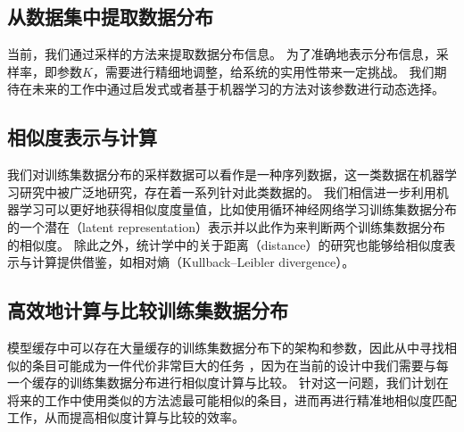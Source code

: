 \subsection{从数据集中提取数据分布}
当前，我们通过采样的方法来提取数据分布信息。
为了准确地表示分布信息，采样率，即参数$K$，需要进行精细地调整，给系统的实用性带来一定挑战。
我们期待在未来的工作中通过启发式或者基于机器学习的方法对该参数进行动态选择。


\subsection{相似度表示与计算}
我们对训练集数据分布的采样数据可以看作是一种序列数据，这一类数据在机器学习研究中被广泛地研究，存在着一系列针对此类数据的{\model}\cite{krizhevsky2012imagenet, szegedy2015going, simonyan2014very}。
我们相信进一步利用机器学习可以更好地获得相似度度量值，比如使用循环神经网络学习训练集数据分布的一个潜在（latent representation）表示并以此作为{\model}来判断两个训练集数据分布的相似度。
除此之外，统计学中的关于距离（distance）的研究也能够给相似度表示与计算提供借鉴，如相对熵（Kullback–Leibler divergence）。


\subsection{高效地计算与比较训练集数据分布}
模型缓存中可以存在大量缓存的训练集数据分布下的{\rmi}架构和参数，因此从中寻找相似的条目可能成为一件代价非常巨大的任务
，因为在当前的设计中我们需要与每一个缓存的训练集数据分布进行相似度计算与比较。
针对这一问题，我们计划在将来的工作中使用类似\cite{metwally2005efficient, ilyas2008survey}的方法滤最可能相似的条目，进而再进行精准地相似度匹配工作，从而提高相似度计算与比较的效率。


